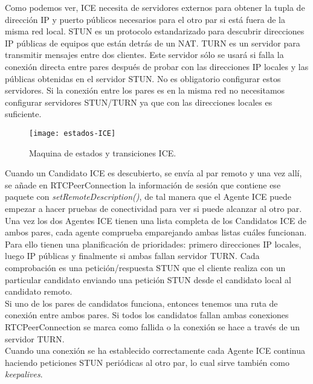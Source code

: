 Como podemos ver, ICE necesita de servidores externos para obtener la tupla de dirección IP y puerto públicos necesarios para el otro par si está fuera de la misma red local. STUN  es un protocolo estandarizado para descubrir direcciones IP públicas de equipos que están detrás de un NAT. TURN es un servidor para transmitir mensajes entre dos clientes. Este servidor sólo se usará si falla la conexión directa entre pares después de probar con las direcciones IP locales y las públicas obtenidas en el servidor STUN. No es obligatorio configurar estos servidores. Si la conexión entre los pares es en la misma red no necesitamos configurar servidores STUN/TURN ya que con las direcciones locales es suficiente.\\

\begin{figure}[h!]
\centering
\texttt{[image: estados-ICE]}
\caption{Maquina de estados y transiciones ICE.}
\label{fig:estados-ice}
\end{figure}

 
Cuando un Candidato ICE es descubierto, se envía al par remoto y una vez allí, se añade en RTCPeerConnection la información de sesión que contiene ese paquete con \textit{setRemoteDescription()}, de tal manera que el Agente ICE puede empezar a hacer pruebas de conectividad para ver si puede alcanzar al otro par.\\

Una vez los dos Agentes ICE tienen una lista completa de los Candidatos ICE de ambos pares, cada agente comprueba emparejando ambas listas cuáles funcionan. Para ello tienen una planificación de prioridades: primero direcciones IP locales, luego IP públicas y finalmente si ambas fallan servidor TURN. Cada comprobación es una petición/respuesta STUN que el cliente realiza con un particular candidato enviando una petición STUN desde el candidato local al candidato remoto.\\

Si uno de los pares de candidatos funciona, entonces tenemos una ruta de conexión entre ambos pares. Si todos los candidatos fallan ambas conexiones RTCPeerConnection se marca como fallida o la conexión se hace a través de un servidor TURN.\\

Cuando una conexión se ha establecido correctamente cada Agente ICE continua haciendo peticiones STUN periódicas al otro par, lo cual sirve también como \textit{keepalives}.\\

